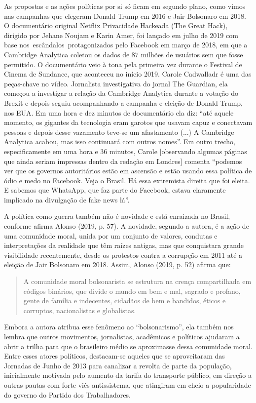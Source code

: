 As propostas e as ações políticas por si só ficam em segundo plano, como
vimos nas campanhas que elegeram Donald Trump em 2016 e Jair Bolsonaro
em 2018. O documentário original Netflix Privacidade Hackeada (The Great
Hack), dirigido por Jehane Noujam e Karin Amer, foi lançado em julho de
2019 com base nos~escândalos~protagonizados pelo Facebook em março de
2018, em que a Cambridge Analytica coletou os dados de 87 milhões de
usuários sem que fosse permitido. O documentário veio à tona pela
primeira vez durante o Festival de Cinema de Sundance, que aconteceu no
início 2019. Carole Cadwalladr é uma das peças-chave no vídeo.
Jornalista investigativa do jornal The Guardian, ela começou a
investigar a relação da Cambridge Analytica durante a votação do Brexit
e depois seguiu acompanhando a campanha e eleição de Donald Trump, nos
EUA. Em uma hora e dez minutos de documentário ela diz: ``até aquele
momento, os gigantes da tecnologia eram garotos que usavam capuz e
conectavam pessoas e depois desse vazamento teve-se um afastamento (...)
A Cambridge Analytica acabou, mas isso continuará com outros nomes''. Em
outro trecho, especificamente em uma hora e 36 minutos, Carole
{[}observando algumas páginas que ainda seriam impressas dentro da
redação em Londres{]} comenta ``podemos ver que os governos autoritários
estão em ascensão e estão usando essa política de ódio e medo no
Facebook. Veja o Brasil. Há essa extremista direita que foi eleita. E
sabemos que WhatsApp, que faz parte do Facebook, estava claramente
implicado na divulgação de fake news lá''.

A política como guerra também não é novidade e está enraizada no Brasil,
conforme afirma Alonso (2019, p. 57). A novidade, segundo a autora, é a
ação de uma comunidade moral, unida por um conjunto de valores, condutas
e interpretações da realidade que têm raízes antigas, mas que
conquistara grande visibilidade recentemente, desde os protestos contra
a corrupção em 2011 até a eleição de Jair Bolsonaro em 2018. Assim,
Alonso (2019, p. 52) afirma que:

\begin{quote}
A comunidade moral bolsonarista se estrutura na crença compartilhada em
códigos binários, que divide o mundo em bem e mal, sagrado e profano,
gente de família e indecentes, cidadãos de bem e bandidos, éticos e
corruptos, nacionalistas e globalistas.
\end{quote}

Embora a autora atribua esse fenômeno ao ``bolsonarismo'', ela também
nos lembra que outros movimentos, jornalistas, acadêmicos e políticos
ajudaram a abrir a trilha para que o brasileiro médio se aproximasse
dessa comunidade moral. Entre esses atores políticos, destacam-se
aqueles que se aproveitaram das Jornadas de Junho de 2013 para canalizar
a revolta de parte da população, inicialmente motivada pelo aumento da
tarifa do transporte público, em direção a outras pautas com forte viés
antissistema, que atingiram em cheio a popularidade do governo do
Partido dos Trabalhadores.

